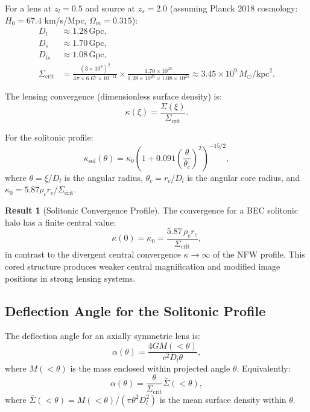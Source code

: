 \documentclass[11pt,a4paper]{article}
\newcommand{\ee}[1]{\times 10^{#1}}
\newcommand{\Msun}{\ensuremath{M_\odot}}
\newcommand{\kpc}{\ensuremath{\mathrm{kpc}}}
\newcommand{\Gpc}{\ensuremath{\mathrm{Gpc}}}
\theoremstyle{definition}
\newtheorem{result}{Result}[section]
\theoremstyle{remark}
\begin{document}
For a lens at $z_l = 0.5$ and source at $z_s = 2.0$ (assuming Planck 2018 cosmology: $H_0 = 67.4$ km/s/Mpc, $\Omega_m = 0.315$):
\begin{align}
D_l &\approx 1.28 \, \Gpc, \\
D_s &\approx 1.70 \, \Gpc, \\
D_{ls} &\approx 1.08 \, \Gpc, \\
\Sigma_{\mathrm{crit}} &= \frac{(3 \ee{8})^2}{4\pi \times 6.67 \ee{-11}} \times \frac{1.70 \ee{25}}{1.28 \ee{25} \times 1.08 \ee{25}} \approx 3.45 \ee{9} \, \Msun/\kpc^2.
\end{align}

The lensing convergence (dimensionless surface density) is:
\begin{equation}
\label{eq:convergence_def}
\kappa(\xi) = \frac{\Sigma(\xi)}{\Sigma_{\mathrm{crit}}}.
\end{equation}

For the solitonic profile:
\begin{equation}
\label{eq:kappa_soliton}
\boxed{\kappa_{\mathrm{sol}}(\theta) = \kappa_0 \left(1 + 0.091 \left(\frac{\theta}{\theta_c}\right)^2\right)^{-15/2},}
\end{equation}
where $\theta = \xi/D_l$ is the angular radius, $\theta_c = r_c/D_l$ is the angular core radius, and $\kappa_0 = 5.87 \rho_c r_c/\Sigma_{\mathrm{crit}}$.

\begin{result}[Solitonic Convergence Profile]
\label{res:solitonic_convergence}
The convergence for a BEC solitonic halo has a finite central value:
\begin{equation}
\kappa(0) = \kappa_0 = \frac{5.87 \, \rho_c r_c}{\Sigma_{\mathrm{crit}}},
\end{equation}
in contrast to the divergent central convergence $\kappa \to \infty$ of the NFW profile. This cored structure produces weaker central magnification and modified image positions in strong lensing systems.
\end{result}

\subsection{Deflection Angle for the Solitonic Profile}
\label{sec:deflection_soliton}

The deflection angle for an axially symmetric lens is:
\begin{equation}
\label{eq:deflection_axial}
\alpha(\theta) = \frac{4G M(<\theta)}{c^2 D_l \theta},
\end{equation}
where $M(<\theta)$ is the mass enclosed within projected angle $\theta$. Equivalently:
\begin{equation}
\alpha(\theta) = \frac{\theta}{\Sigma_{\mathrm{crit}}} \bar{\Sigma}(<\theta),
\end{equation}
where $\bar{\Sigma}(<\theta) = M(<\theta)/(\pi\theta^2 D_l^2)$ is the mean surface density within $\theta$.
\end{document}
